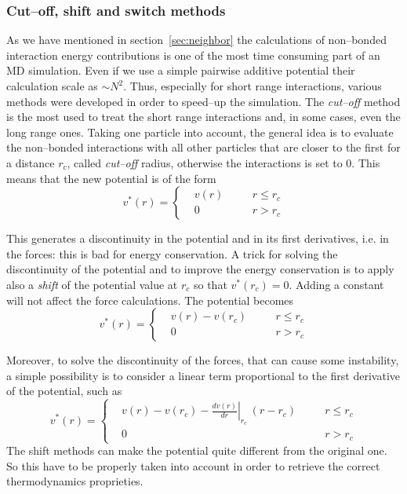 \subsubsection{Cut--off, shift and switch methods}
As we have mentioned in section~\ref{sec:neighbor} the calculations of non--bonded interaction energy 
contributions is one of the most time consuming part of an \ac{MD} simulation. Even if we use a simple pairwise 
additive potential their calculation scale as $\sim N^2$. Thus, especially for short range interactions, various 
methods were developed in order to speed--up the simulation. The \textit{cut--off} method is the most used to 
treat the short range interactions and, in some cases, even the long range ones. Taking one particle into 
account, the general idea is to evaluate the non--bonded interactions with all other particles that are closer to 
the first for a distance $r_c$, called \textit{cut--off} radius, otherwise the interactions is set to $0$. This 
means that the new potential is of the form
\begin{equation*}
v^*(r) = \left \{
	\begin{aligned}
&v(r) & \quad & r \le r_c \\
&0    & \quad & r >   r_c
	\end{aligned} \right .
\end{equation*}

This generates a discontinuity in the potential and in its first derivatives, i.e. in the forces: this is bad for 
energy conservation. A trick for solving the discontinuity of the potential and to improve the energy 
conservation is to apply also a \textit{shift} of the potential value at $r_c$ so that $v^*(r_c) = 0$. Adding a 
constant will not affect the force calculations. The potential becomes
\begin{equation*}
v^*(r) = \left \{
	\begin{aligned}
&v(r) - v(r_c) & \quad & r \le r_c \\
&0    & \quad  & r >   r_c
	\end{aligned} \right .
\end{equation*}

Moreover, to solve the discontinuity of the forces, that can cause some instability, a simple possibility is to  
consider a linear term proportional to the first derivative of the potential, such as
\begin{equation*}
v^*(r) = \left \{
	\begin{aligned}
&v(r) - v(r_c) - \left . \frac{dv(r)}{dr}\right |_{r_c}\ (r - r_c) & \quad & r \le r_c \\
&0    & \quad  & r >   r_c
	\end{aligned} \right .
\end{equation*}
The shift methods can make the potential quite different from the original one. So this have to be properly taken 
into account in order to retrieve the correct thermodynamics proprieties.

